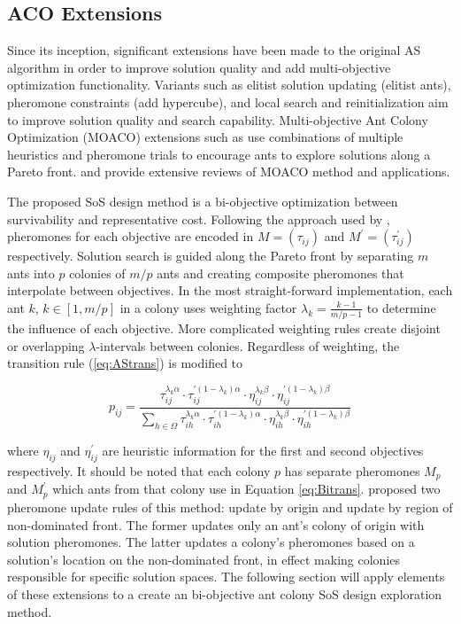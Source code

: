 \documentclass[preprint,12pt]{elsarticle}
\begin{document}
\subsection{ACO Extensions}

Since its inception, significant extensions have been made to the original AS algorithm in order to improve solution quality and add multi-objective optimization functionality. Variants such as elitist solution updating (elitist ants), pheromone constraints \citep{Stutzle2000}(add hypercube), and local search and reinitialization \citep{Ashraf2013} aim to improve solution quality and search capability. Multi-objective Ant Colony Optimization (MOACO) extensions such as \citep{Angus2009,Iredi2001} use combinations of multiple heuristics and pheromone trials to encourage ants to explore solutions along a Pareto front. \cite{Garcia-Martinez2007} and \cite{Rada-Vilela2013} provide extensive reviews of MOACO method and applications. 

The proposed SoS design method is a bi-objective optimization between survivability and representative cost. Following the approach used by \cite{Iredi2001}, pheromones for each objective are encoded in $M=(\tau_{ij})$ and $M^{'}=(\tau_{ij}^{'})$ respectively. Solution search is guided along the Pareto front by separating $m$ ants into $p$ colonies of $m/p$ ants and creating composite pheromones that interpolate between objectives. In the most straight-forward implementation, each ant $k$, $k \in [1,m/p]$ in a colony uses weighting factor $\lambda_{k}=\frac{k-1}{m/p-1}$ to determine the influence of each objective. More complicated weighting rules create disjoint or overlapping $\lambda$-intervals between colonies. Regardless of weighting, the transition rule (\ref{eq:AStrans}) is modified to

\begin{equation}
p_{ij}=\frac{\tau_{ij}^{\lambda_k\alpha}\cdot\tau_{ij}^{'(1-\lambda_k)\alpha}\cdot\eta_{ij}^{\lambda_k\beta}\cdot\eta_{ij}^{'(1-\lambda_k)\beta}}{\sum_{h\in\Omega}\tau_{ih}^{\lambda_k\alpha}\cdot\tau_{ih}^{'(1-\lambda_k)\alpha}\cdot\eta_{ih}^{\lambda_k\beta}\cdot\eta_{ih}^{'(1-\lambda_k)\beta}}
\label{eq:Bitrans}
\end{equation}

\noindent where $\eta_{ij}$ and $\eta^{'}_{ij}$ are heuristic information for the first and second objectives respectively. It should be noted that each colony $p$ has separate pheromones $M_p$ and $M^{'}_p$ which ants from that colony use in Equation \ref{eq:Bitrans}. \cite{Iredi2001} proposed two pheromone update rules of this method: update by origin and update by region of non-dominated front. The former updates only an ant's colony of origin with solution pheromones. The latter updates a colony's pheromones based on a solution's location on the non-dominated front, in effect making colonies responsible for specific solution spaces. The following section will apply elements of these extensions to a create an bi-objective ant colony SoS design exploration method.
\end{document}
